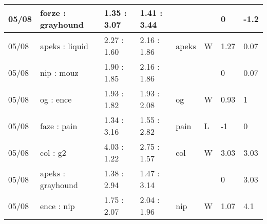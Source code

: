\begin{small}
\begin{longtable}{|l|l|l|l|l|l|l|l|}
	05/08                               & forze : grayhound                   & 1.35 : 3.07                             & 1.41 : 3.44                             &                                   &                                   & 0                                    & -1.2                              \\ \hline
	05/08                               & apeks : liquid                      & 2.27 : 1.60                             & 2.16 : 1.86                             & apeks                             & W                                 & 1.27                                 & 0.07                              \\ \hline
	05/08                               & nip : mouz                          & 1.90 : 1.85                             & 2.16 : 1.86                             &                                   &                                   & 0                                    & 0.07                              \\ \hline
	05/08                               & og : ence                           & 1.93 : 1.82                             & 1.93 : 2.08                             & og                                & W                                 & 0.93                                 & 1                                 \\ \hline
	05/08                               & faze : pain                         & 1.34 : 3.16                             & 1.55 : 2.82                             & pain                              & L                                 & -1                                   & 0                                 \\ \hline
	05/08                               & col : g2                            & 4.03 : 1.22                             & 2.75 : 1.57                             & col                               & W                                 & 3.03                                 & 3.03                              \\ \hline
	05/08                               & apeks : grayhound                   & 1.38 : 2.94                             & 1.47 : 3.14                             &                                   &                                   & 0                                    & 3.03                              \\ \hline
	05/08                               & ence : nip                          & 1.75 : 2.07                             & 2.04 : 1.96                             & nip                               & W                                 & 1.07                                 & 4.1                               \\ \hline

\end{longtable}
\end{small}
